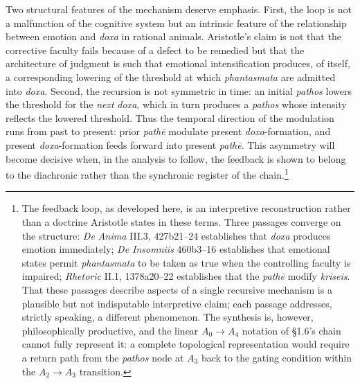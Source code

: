 Two structural features of the mechanism deserve emphasis. First, the loop is not a malfunction of the cognitive system but an intrinsic feature of the relationship between emotion and \textit{doxa} in rational animals. Aristotle's claim is not that the corrective faculty fails because of a defect to be remedied but that the architecture of judgment is such that emotional intensification produces, of itself, a corresponding lowering of the threshold at which \textit{phantasmata} are admitted into \textit{doxa}. Second, the recursion is not symmetric in time: an initial \textit{pathos} lowers the threshold for the \textit{next} \textit{doxa}, which in turn produces a \textit{pathos} whose intensity reflects the lowered threshold. Thus the temporal direction of the modulation runs from past to present: prior \textit{path\=e} modulate present \textit{doxa}-formation, and present \textit{doxa}-formation feeds forward into present \textit{path\=e}. This asymmetry will become decisive when, in the analysis to follow, the feedback is shown to belong to the diachronic rather than the synchronic register of the chain.\footnote{The feedback loop, as developed here, is an interpretive reconstruction rather than a doctrine Aristotle states in these terms. Three passages converge on the structure: \textit{De Anima} III.3, 427b21--24 establishes that \textit{doxa} produces emotion immediately; \textit{De Insomniis} 460b3--16 establishes that emotional states permit \textit{phantasmata} to be taken as true when the controlling faculty is impaired; \textit{Rhetoric} II.1, 1378a20--22 establishes that the \textit{path\=e} modify \textit{kriseis}. That these passages describe aspects of a single recursive mechanism is a plausible but not indisputable interpretive claim; each passage addresses, strictly speaking, a different phenomenon. The synthesis is, however, philosophically productive, and the linear $A_0 \rightarrow A_4$ notation of \S1.6's chain cannot fully represent it: a complete topological representation would require a return path from the \textit{pathos} node at $A_3$ back to the gating condition within the $A_2 \rightarrow A_3$ transition.}

